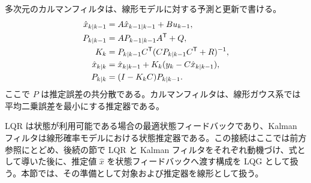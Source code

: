 多次元のカルマンフィルタは、線形モデルに対する予測と更新で書ける。
\begin{align}
  \hat{x}_{k|k-1}&=A\hat{x}_{k-1|k-1}+Bu_{k-1},\\
  P_{k|k-1}&=AP_{k-1|k-1}A^{\mathsf{T}}+Q,\\
  K_k&=P_{k|k-1}C^{\mathsf{T}}(CP_{k|k-1}C^{\mathsf{T}}+R)^{-1},\\
  \hat{x}_{k|k}&=\hat{x}_{k|k-1}+K_k(y_k-C\hat{x}_{k|k-1}),\\
  P_{k|k}&=(I-K_kC)P_{k|k-1}.
\end{align}
ここで $P$ は推定誤差の共分散である。カルマンフィルタは、線形ガウス系では平均二乗誤差を最小にする推定器である。

LQR は状態が利用可能である場合の最適状態フィードバックであり、Kalman フィルタは線形確率モデルにおける状態推定器である。この接続はここでは前方参照にとどめ、後続の節で LQR と Kalman フィルタをそれぞれ動機づけ、式として導いた後に、推定値 $\hat{x}$ を状態フィードバックへ渡す構成を LQG として扱う。本節では、その準備として対象および推定器を線形として扱う。
